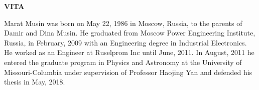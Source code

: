 \newpage
{}

\centerline{\bf \large VITA}
\vspace{10mm} %



Marat Musin was born on May 22, 1986 in Moscow, Russia, to the parents of Damir and Dina Musin. He graduated from Moscow Power Engineering Institute, Russia, in February, 2009 with an Engineering degree in Industrial Electronics. He worked as an Engineer at Ruselprom Inc until June, 2011. In August, 2011 he entered the graduate program in Physics and Astronomy at the University of Missouri-Columbia under supervision of Professor Haojing Yan and defended his thesis in May, 2018.
